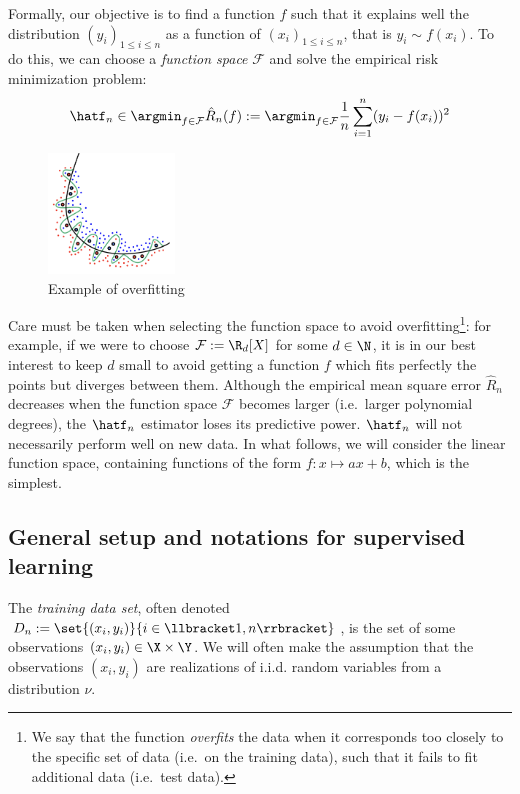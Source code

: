 \documentclass{../cs-classes/cs-classes}
\begin{document}
Formally, our objective is to find a function $f$ such that it explains well the distribution $(y_i)_{1\leq i\leq n}$ as a function of $(x_i)_{1\leq i\leq n}$, that is $y_i\sim f(x_i)$. To do this, we can choose a \emph{function space} $\mathcal{F}$ and solve the empirical risk minimization problem:
\begin{equation*}
    \hatf_n \in \argmin_{f\in\mathcal{F}} \hat{R}_n(f) := \argmin_{f\in\mathcal{F}} \frac{1}{n}\sum_{i=1}^n (y_i-f(x_i))^2
\end{equation*}
\begin{figure}
    \includegraphics[width=0.3\textwidth]{images/overfitting.png}
    \caption{Example of overfitting}
\end{figure}

Care must be taken when selecting the function space to avoid overfitting\footnote{We say that the function \emph{overfits} the data when it corresponds too closely to the specific set of data (i.e.~on the training data), such that it fails to fit additional data (i.e.~test data).}: for example, if we were to choose $\mathcal{F}:=\R_d[X]$ for some $d\in\N$, it is in our best interest to keep $d$ small to avoid getting a function $f$ which fits perfectly the points but diverges between them. Although the empirical mean square error $\hat{R}_n$ decreases when the function space $\mathcal{F}$ becomes larger (i.e.~larger polynomial degrees), the $\hatf_n$ estimator loses its predictive power. $\hatf_n$ will not necessarily perform well on new data. In what follows, we will consider the linear function space, containing functions of the form $f:x\mapsto ax+b$, which is the simplest.

\subsection{General setup and notations for supervised learning}
\begin{definition}
    The \emph{training data set}, often denoted $D_n:=\set{(x_i, y_i)}{i\in\llbracket 1, n \rrbracket}$, is the set of some observations $(x_i, y_i)\in\X\times\Y$. We will often make the assumption that the observations $(x_i, y_i)$ are realizations of i.i.d. random variables from a distribution $\nu$.
\end{definition}
\end{document}
